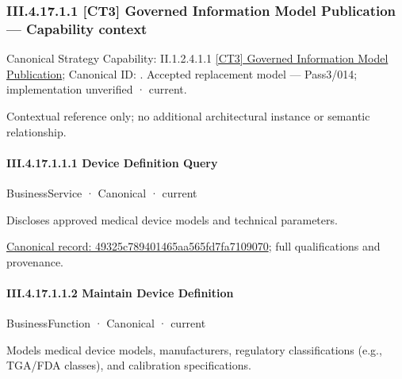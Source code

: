 \subsubsection*{III.4.17.1.1 [CT3] Governed Information Model Publication — Capability context}
\label{navigation:III.4.17.1.1}

{\small Canonical Strategy Capability: II.1.2.4.1.1 \hyperref[element:eb4a50dfdf8a46f2953b80671cb504cf]{[CT3] Governed Information Model Publication}; Canonical ID: \texttt{}. Accepted replacement model — Pass3/014; implementation unverified · current.}\par
Contextual reference only; no additional architectural instance or semantic relationship.\par
\paragraph*{III.4.17.1.1.1 Device Definition Query}
\label{navigation:III.4.17.1.1.1}

\label{element:49325c789401465aa565fd7fa7109070}
{\small BusinessService · Canonical · current}\par

Discloses approved medical device models and technical parameters.


{\footnotesize \href{../../../../../../../../continuum/business/business-service/49325c789401465aa565fd7fa7109070.md}{Canonical record: 49325c789401465aa565fd7fa7109070}; full qualifications and provenance.}\par
\paragraph*{III.4.17.1.1.2 Maintain Device Definition}
\label{navigation:III.4.17.1.1.2}

\label{element:d44083e67fb540579737337cabf2c227}
{\small BusinessFunction · Canonical · current}\par

Models medical device models, manufacturers, regulatory classifications (e.g., TGA/FDA classes), and calibration specifications.


